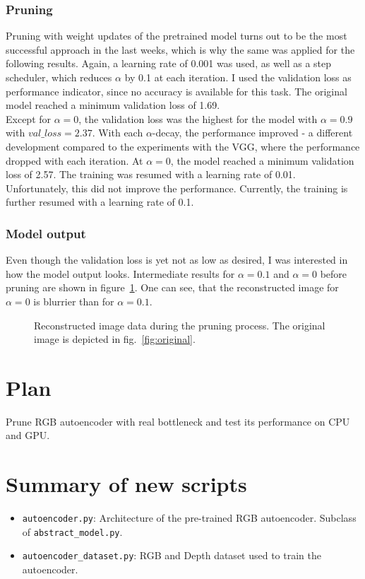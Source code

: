 \documentclass[10pt,twocolumn,letterpaper]{article}
\begin{document}
\subsubsection{Pruning}
Pruning with weight updates of the pretrained model turns out to be the most successful approach in the last weeks, which is why the same was applied for the following results.
Again, a learning rate of 0.001 was used, as well as a step scheduler, which reduces $\alpha$ by 0.1 at each iteration.
I used the validation loss as performance indicator, since no accuracy is available for this task.
The original model reached a minimum validation loss of 1.69.\\
Except for $\alpha=0$, the validation loss was the highest for the model with $\alpha=0.9$ with $val\_loss=2.37$.
With each $\alpha$-decay, the performance improved - a different development compared to the experiments with the VGG, where the performance dropped with each iteration.
At $\alpha=0$, the model reached a minimum validation loss of 2.57.
The training was resumed with a learning rate of 0.01.
Unfortunately, this did not improve the performance.
Currently, the training is further resumed with a learning rate of 0.1.

\subsubsection{Model output}
Even though the validation loss is yet not as low as desired, I was interested in how the model output looks.
Intermediate results for $\alpha=0.1$ and $\alpha=0$ before pruning are shown in figure~\ref{fig:results}.
One can see, that the reconstructed image for $\alpha=0$ is blurrier than for $\alpha=0.1$.
\begin{figure}[hpbt]
	\centering
	\qquad
	\caption[]{Reconstructed image data during the pruning process. The original image is depicted in fig.~\ref{fig:original}.}
	\label{fig:results}
\end{figure}

\section{Plan}
Prune RGB autoencoder with real bottleneck and test its performance on CPU and GPU.

\section{Summary of new scripts}
\begin{itemize}
	\item \texttt{autoencoder.py}: Architecture of the pre-trained RGB autoencoder.
		Subclass of \texttt{abstract\_model.py}.
	\item \texttt{autoencoder\_dataset.py}: RGB and Depth dataset used to train the autoencoder.
\end{itemize}

{\small


}
\end{document}
